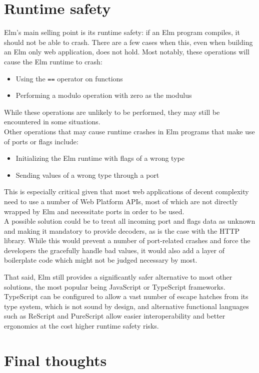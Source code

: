 \section{Runtime safety}
Elm's main selling point is its runtime safety: if an Elm program compiles, it should not be able to crash. There are a few cases when this, even when building an Elm only web application, does not hold. Most notably, these operations will cause the Elm runtime to crash:
\begin{itemize}
    \item Using the \texttt{==} operator on functions \cite{noauthor_corehints5md_nodate}
    \item Performing a modulo operation with zero as the modulus \cite{noauthor_corehints11md_nodate}
\end{itemize}
While these operations are unlikely to be performed, they may still be encountered in some situations.\\

Other operations that may cause runtime crashes in Elm programs that make use of ports or flags include:
\begin{itemize}
    \item Initializing the Elm runtime with flags of a wrong type \cite{noauthor_corehints2md_nodate}
    \item Sending values of a wrong type through a port \cite{noauthor_corehints4md_nodate}
\end{itemize}
This is especially critical given that most web applications of decent complexity need to use a number of Web Platform APIs, most of which are not directly wrapped by Elm and necessitate ports in order to be used.\\
A possible solution could be to treat all incoming port and flags data as unknown and making it mandatory to provide decoders, as is the case with the HTTP library. While this would prevent a number of port-related crashes and force the developers the gracefully handle bad values, it would also add a layer of boilerplate code which might not be judged necessary by most.

That said, Elm still provides a significantly safer alternative to most other solutions, the most popular being JavaScript or TypeScript frameworks. TypeScript can be configured to allow a vast number of escape hatches from its type system, which is not sound by design, and alternative functional languages such as ReScript and PureScript allow easier interoperability and better ergonomics at the cost higher runtime safety risks.

\section{Final thoughts}

